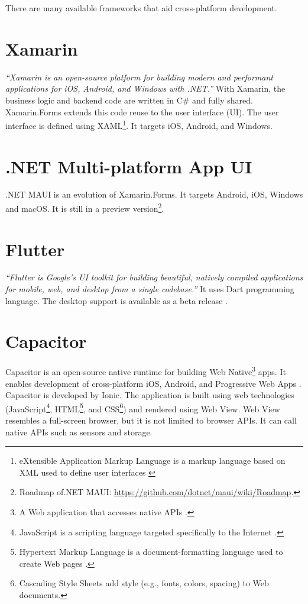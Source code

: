 \documentclass[
  digital, %
  table,   %
  oneside, %
  lof,     %
  lot,     %
]{fithesis3}
\begin{document}
There are many available frameworks that aid cross-platform development.

\section{Xamarin}
\textit{``Xamarin is an open-source platform for building modern and performant applications for iOS, Android, and Windows with .NET.''} \cite{WhatIsXamarin} With Xamarin, the business logic and backend code are written in C\# and fully shared.
Xamarin.Forms extends this code reuse to the user interface (UI). The user interface is defined using XAML\footnote{eXtensible Application Markup Language is a markup language based on XML used to define user interfaces \cite{Hermes2019Building}}. It targets iOS, Android, and Windows.

\section{.NET Multi-platform App UI}
.NET MAUI is an evolution of Xamarin.Forms. It targets Android, iOS, Windows and macOS. It is still in a preview version\footnote{Roadmap of.NET MAUI: \url{https://github.com/dotnet/maui/wiki/Roadmap}.}.

\section{Flutter}
\textit{``Flutter is Google’s UI toolkit for building beautiful, natively compiled applications for mobile, web, and desktop from a single codebase.''} \cite{FlutterHomepage} It uses Dart programming language. The desktop support is available as a beta release \cite{FlutterDesktopSupport}.

\section{Capacitor}
Capacitor is an open-source native runtime for building Web Native\footnote{A Web application that accesses native APIs \cite{WebNative}.} apps. It enables development of cross-platform iOS, Android, and Progressive Web Apps \cite{CapacitorHomepage}. Capacitor is developed by Ionic. The application is built using web technologies (JavaScript\footnote{JavaScript is a scripting language targeted specifically to the Internet \cite{GartnerJavaScript}.}, HTML\footnote{Hypertext Markup Language is a document-formatting language used to create Web pages \cite{GartnerHTML}.}, and CSS\footnote{Cascading Style Sheets add style (e.g., fonts, colors, spacing) to Web documents\cite{W3CCSS}.}) and rendered using Web View. Web View resembles a full-screen browser, but it is not limited to browser APIs. It can call native APIs such as sensors and storage.
\end{document}
